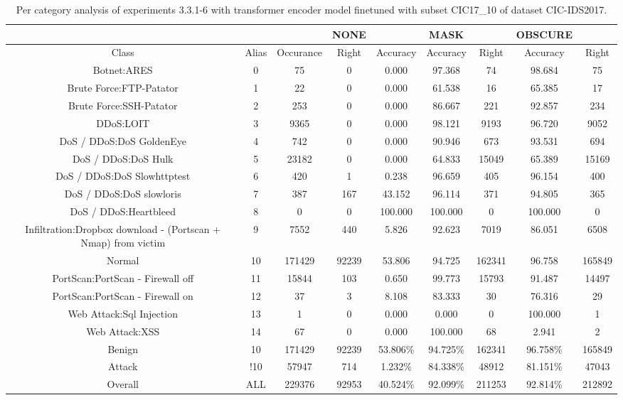 \begin{table}[htb]
    \centering
    \begin{tabular}{@{}ccccccccc@{}}
        \toprule
         &  &  & NONE &  & MASK &  & OBSCURE &  \\
        \midrule
        Class &  Alias &  Occurance &  Right &  Accuracy &  Accuracy &  Right &  Accuracy &  Right \\
        Botnet:ARES &  0 &  75 &  0 &  0.000 &  97.368 &  74 &  98.684 &  75 \\
        Brute Force:FTP-Patator &  1 &  22 &  0 &  0.000 &  61.538 &  16 &  65.385 &  17 \\
        Brute Force:SSH-Patator &  2 &  253 &  0 &  0.000 &  86.667 &  221 &  92.857 &  234 \\
        DDoS:LOIT &  3 &  9365 &  0 &  0.000 &  98.121 &  9193 &  96.720 &  9052 \\
        DoS / DDoS:DoS GoldenEye &  4 &  742 &  0 &  0.000 &  90.946 &  673 &  93.531 &  694 \\
        DoS / DDoS:DoS Hulk &  5 &  23182 &  0 &  0.000 &  64.833 &  15049 &  65.389 &  15169 \\
        DoS / DDoS:DoS Slowhttptest &  6 &  420 &  1 &  0.238 &  96.659 &  405 &  96.154 &  400 \\
        DoS / DDoS:DoS slowloris &  7 &  387 &  167 &  43.152 &  96.114 &  371 &  94.805 &  365 \\
        DoS / DDoS:Heartbleed &  8 &  0 &  0 &  100.000 &  100.000 &  0 &  100.000 &  0 \\
        Infiltration:Dropbox download - (Portscan + Nmap) from victim &  9 &  7552 &  440 &  5.826 &  92.623 &  7019 &  86.051 &  6508 \\
        Normal &  10 &  171429 &  92239 &  53.806 &  94.725 &  162341 &  96.758 &  165849 \\
        PortScan:PortScan - Firewall off &  11 &  15844 &  103 &  0.650 &  99.773 &  15793 &  91.487 &  14497 \\
        PortScan:PortScan - Firewall on &  12 &  37 &  3 &  8.108 &  83.333 &  30 &  76.316 &  29 \\
        Web Attack:Sql Injection &  13 &  1 &  0 &  0.000 &  0.000 &  0 &  100.000 &  1 \\
        Web Attack:XSS &  14 &  67 &  0 &  0.000 &  100.000 &  68 &  2.941 &  2 \\
        Benign &  10 &  171429 &  92239 &  53.806\% &  94.725\% &  162341 &  96.758\% &  165849 \\
        Attack &  !10 &  57947 &  714 &  1.232\% &  84.338\% &  48912 &  81.151\% &  47043 \\
        Overall &  ALL &  229376 &  92953 &  40.524\% &  92.099\% &  211253 &  92.814\% &  212892 \\
        \bottomrule
    \end{tabular}
    \caption{Per category analysis of experiments 3.3.1-6 with transformer encoder model finetuned with subset CIC17\_10 of dataset CIC-IDS2017.}
    \label{table:results:lstm:class_flows_subset}
\end{table}